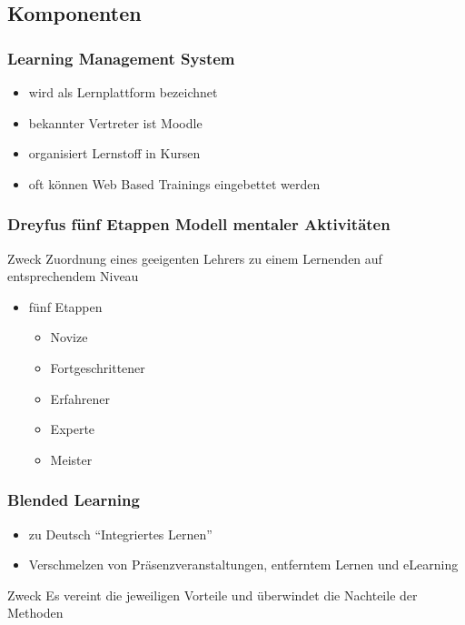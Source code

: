 \documentclass[xcolor=dvipsnames, utf8]{beamer}
\begin{document}
\subsection{Komponenten}
\begin{frame}
\frametitle{Learning Management System}
\begin{itemize}
  \item wird als Lernplattform bezeichnet
  \item bekannter Vertreter ist Moodle
  \item organisiert Lernstoff in Kursen
  \item oft können Web Based Trainings eingebettet werden
\end{itemize}
\end{frame}
\begin{frame}
\frametitle{Dreyfus fünf Etappen Modell mentaler Aktivitäten}
\begin{block}{Zweck}
Zuordnung eines geeigenten Lehrers zu einem Lernenden auf entsprechendem Niveau
\end{block}
\begin{itemize}
  \item fünf Etappen\begin{itemize}
    \item Novize
    \item Fortgeschrittener
    \item Erfahrener
    \item Experte
    \item Meister
  \end{itemize}
\end{itemize}
\end{frame}
\begin{frame}
\frametitle{Blended Learning}
\begin{itemize}
  \item zu Deutsch "`Integriertes Lernen"'
  \item Verschmelzen von Präsenzveranstaltungen, entferntem Lernen und eLearning
\end{itemize}
\begin{block}{Zweck}
Es vereint die jeweiligen Vorteile und überwindet die Nachteile der Methoden 
\end{block}
\end{frame}
\end{document}
